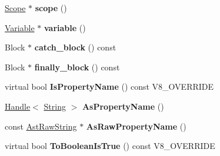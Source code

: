 \begin{DoxyCompactItemize}
\item 
\hypertarget{classv8_1_1internal_1_1_v8___f_i_n_a_l_a1eae21e02943693e9cfb0e13aeb0e191}{}\hyperlink{classv8_1_1internal_1_1_v8___f_i_n_a_l_1_1_scope}{Scope} $\ast$ {\bfseries scope} ()\label{classv8_1_1internal_1_1_v8___f_i_n_a_l_a1eae21e02943693e9cfb0e13aeb0e191}

\item 
\hypertarget{classv8_1_1internal_1_1_v8___f_i_n_a_l_aa29c0fd3e057aafe0517cee73c70d49e}{}\hyperlink{classv8_1_1internal_1_1_variable}{Variable} $\ast$ {\bfseries variable} ()\label{classv8_1_1internal_1_1_v8___f_i_n_a_l_aa29c0fd3e057aafe0517cee73c70d49e}

\item 
\hypertarget{classv8_1_1internal_1_1_v8___f_i_n_a_l_a16662f51928e91ce132c6e0de7ecb71b}{}Block $\ast$ {\bfseries catch\+\_\+block} () const \label{classv8_1_1internal_1_1_v8___f_i_n_a_l_a16662f51928e91ce132c6e0de7ecb71b}

\item 
\hypertarget{classv8_1_1internal_1_1_v8___f_i_n_a_l_afd64ba7a43e65d56ae09b0062b24a2c1}{}Block $\ast$ {\bfseries finally\+\_\+block} () const \label{classv8_1_1internal_1_1_v8___f_i_n_a_l_afd64ba7a43e65d56ae09b0062b24a2c1}

\item 
\hypertarget{classv8_1_1internal_1_1_v8___f_i_n_a_l_ac037c4b2e948b4720bb1aefeecd688f8}{}virtual bool {\bfseries Is\+Property\+Name} () const V8\+\_\+\+O\+V\+E\+R\+R\+I\+D\+E\label{classv8_1_1internal_1_1_v8___f_i_n_a_l_ac037c4b2e948b4720bb1aefeecd688f8}

\item 
\hypertarget{classv8_1_1internal_1_1_v8___f_i_n_a_l_a30a94fc36b71697f153be170846dfe49}{}\hyperlink{classv8_1_1internal_1_1_handle}{Handle}$<$ \hyperlink{classv8_1_1internal_1_1_string}{String} $>$ {\bfseries As\+Property\+Name} ()\label{classv8_1_1internal_1_1_v8___f_i_n_a_l_a30a94fc36b71697f153be170846dfe49}

\item 
\hypertarget{classv8_1_1internal_1_1_v8___f_i_n_a_l_af26ee758c93e8c8b6f4d0b5b3e8fbfce}{}const \hyperlink{classv8_1_1internal_1_1_ast_raw_string}{Ast\+Raw\+String} $\ast$ {\bfseries As\+Raw\+Property\+Name} ()\label{classv8_1_1internal_1_1_v8___f_i_n_a_l_af26ee758c93e8c8b6f4d0b5b3e8fbfce}

\item 
\hypertarget{classv8_1_1internal_1_1_v8___f_i_n_a_l_a74392e08c37bbf7095b55ee6c09ee0f0}{}virtual bool {\bfseries To\+Boolean\+Is\+True} () const V8\+\_\+\+O\+V\+E\+R\+R\+I\+D\+E\label{classv8_1_1internal_1_1_v8___f_i_n_a_l_a74392e08c37bbf7095b55ee6c09ee0f0}


\end{DoxyCompactItemize}
